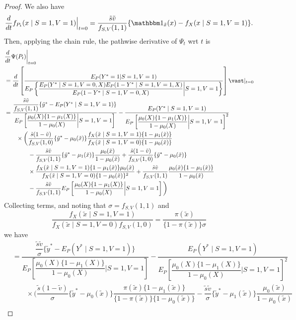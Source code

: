 \begin{proof}
We also have
$$\dfrac{d}{dt}f_{P_t}(x\mid S=1, V=1)\Big\vert_{t=0} = \dfrac{\tilde s \tilde v}{f_{S, V}(1, 1)}\{\mathbbm 1_{\tilde x}(x)-f_X(x\mid S=1, V=1)\}.$$
Then, applying the chain rule, the pathwise derivative of $\Psi_t$ wrt $t$ is
\begin{align*}
   &\frac{d}{dt} \Psi(P_t)\bigg\vert_{t=0} \\
   &= \frac{d}{dt} \left[\dfrac{E_P(Y^* = 1 | S = 1, V = 1)}{E_P\left\{\dfrac{E_P(Y^*\mid S=1, V=0, X)E_P(1 - Y^*\mid S=1, V=1, X)}{E_P(1 - Y^*\mid S=1, V=0, X)} \bigg| S=1, V=1\right\}}\right] \vast\vert_{t=0}  \\
   &= \dfrac{\dfrac{\tilde s\tilde v}{f_{S, V}(1, 1)}\{\tilde y^* - E_P(Y^*\mid S=1, V=1)\}}{E_P\left[\dfrac{\mu_0(X)\{1-\mu_1(X)\}}{1-\mu_0(X)} \bigg| S=1, V=1\right]} - \dfrac{E_P(Y^*\mid S=1, V=1)}{E_P\left[\dfrac{\mu_0(X)\{1-\mu_1(X)\}}{1-\mu_0(X)}\bigg| S=1, V=1\right]^2} \\
   &\qquad \times \bigg( \dfrac{\tilde s(1 - \tilde v)}{f_{S, V}(1, 0)}\{\tilde y^* - \mu_0(\tilde x)\}\dfrac{f_X(\tilde x\mid S=1, V=1)\{1-\mu_1(\tilde x)\}}{f_X(\tilde x\mid S=1, V=0)\{1-\mu_0(\tilde x)\}} \\
   & \qquad \qquad - \dfrac{\tilde s\tilde v}{f_{S, V}(1, 1)}\{\tilde y^* - \mu_1(\tilde x)\}\dfrac{\mu_0(\tilde x)}{1 - \mu_0(\tilde x)} + \dfrac{\tilde s(1 - \tilde v)}{f_{S, V}(1, 0)}\{\tilde y^* - \mu_0(\tilde x)\} \\
   &\qquad \qquad \times \dfrac{f_X(\tilde x\mid S=1, V=1)\{1-\mu_1(\tilde x)\}\mu_0(\tilde x)}{f_X(\tilde x\mid S=1, V=0)\{1-\mu_0(\tilde x)\}^2}+\dfrac{\tilde s\tilde v}{f_{S, V}(1, 1)}\dfrac{\mu_0(\tilde x)\{1-\mu_1(\tilde x)\}}{1-\mu_0(\tilde x)} \\
   & \qquad \qquad - \dfrac{\tilde s\tilde v}{f_{S, V}(1, 1)}E_P\left[\dfrac{\mu_0(X)\{1-\mu_1(X)\}}{1-\mu_0(X)}\bigg| S=1, V=1\right]\bigg) 
\end{align*}
Collecting terms, and noting that $\sigma = f_{S,V}(1, 1)$ and
$$
\dfrac{f_X(\tilde x\mid S=1, V=1)}{f_X(\tilde x\mid S=1, V=0)f_{S,V}(1, 0)} = \dfrac{\pi(\tilde x)}{\{1 - \pi(\tilde x)\} \sigma}
$$
we have
\begin{align*}    
    &= \dfrac{\dfrac{\tilde s\tilde v}{\sigma}\{\tilde y^* - E_P(Y^*\mid S=1, V=1)\}}{E_P\left[\dfrac{\mu_0(X)\{1-\mu_1(X)\}}{1-\mu_0(X)} \bigg| S=1, V=1\right]} - \dfrac{E_P(Y^*\mid S=1, V=1)}{E_P\left[\dfrac{\mu_0(X)\{1-\mu_1(X)\}}{1-\mu_0(X)}\bigg| S=1, V=1\right]^2} \\
    &\qquad \times \bigg( \dfrac{\tilde s(1 - \tilde v)}{\sigma}\{\tilde y^* - \mu_0(\tilde x)\}\dfrac{\pi(\tilde x)\{1-\mu_1(\tilde x)\}}{\{1-\pi(\tilde x)\}\{1-\mu_0(\tilde x)\}} - \dfrac{\tilde s\tilde v}{\sigma}\{\tilde y^* - \mu_1(\tilde x)\}\dfrac{\mu_0(\tilde x)}{1 - \mu_0(\tilde x)} \\ 

\end{align*}
\end{proof}
